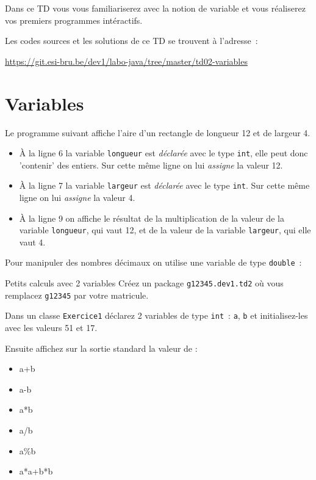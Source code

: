 \documentclass[a4paper,11pt]{article}
\date{2018 -- 2019}
\newcommand{\publicbasepath}
{https://git.esi-bru.be/dev1/labo-java/tree/master/td02-variables}
\begin{document}
\entete
\titre

\lastedit


	Dans ce TD vous vous familiariserez avec la notion de variable et vous 
	réaliserez vos premiers programmes intéractifs.

	Les codes sources et les solutions de ce TD se trouvent à l'adresse~: 
	
	\url{\publicbasepath}	
	
	\tableofcontents

	\newpage
	
\section{Variables}

	Le programme suivant affiche l'aire d'un rectangle de longueur 12 et de largeur 4.
	

	\begin{itemize}
		\item \`A la ligne 6 la variable \texttt{longueur} est \emph{déclarée} 
			avec le type \texttt{int}, elle peut donc 'contenir' des entiers. 
			Sur cette même ligne on lui \emph{assigne} la valeur 12.  

		\item \`A la ligne 7 la variable \texttt{largeur} est \emph{déclarée} avec le type \texttt{int}. 
			Sur cette même ligne on lui \emph{assigne} la valeur 4.
	
		\item \`A la ligne 9 on affiche le résultat de la multiplication de la valeur de la variable \texttt{longueur}, 
			qui vaut 12, et de la valeur de la variable \texttt{largeur}, qui elle vaut 4.  
  	\end{itemize}

	Pour manipuler des nombres décimaux on utilise une variable de type 
	\texttt{double}~:
	




	\begin{Exercice}{Petits calculs avec 2 variables} 		
		Créez un package \texttt{g12345.dev1.td2} où vous remplacez \texttt{g12345} par 
		votre matricule.

		Dans un classe \texttt{Exercice1} déclarez 2 variables de type \texttt{int}~: 
		\texttt{a}, \texttt{b} et initialisez-les avec les valeurs 51 et 17.
		
		Ensuite affichez sur la sortie standard la valeur de :
		\begin{itemize}
		 	\item a+b
			\item a-b
			\item a*b
			\item a/b
			\item a\%b
			\item a*a+b*b
		\end{itemize} 
	\end{Exercice}
\end{document}
